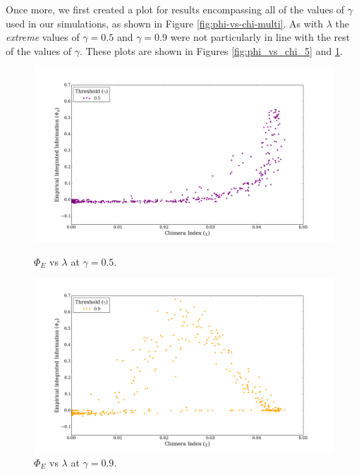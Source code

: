 \documentclass[a4paper,11pt]{article}
\begin{document}
Once more, we first created a plot for results encompassing all of the values of $\gamma$ used in our simulations, as shown in Figure \ref{fig:phi-vs-chi-multi}. As with $\lambda$ the \textit{extreme} values of $\gamma = 0.5$ and $\gamma = 0.9$ were not particularly in line with the rest of the values of $\gamma$. These plots are shown in Figures \ref{fig:phi_vs_chi_5} and \ref{fig:phi_vs_chi_9}.

\begin{figure}[H] 
	\label{fig:phi-vs-chi-extremes} 
	\begin{minipage}[b]{0.5\linewidth}
		\begin{center}
		\includegraphics[scale = 0.2]{figures/phi_vs_chi_5}
		\caption{
			$\Phi_E$ vs $\lambda$ at $\gamma = 0.5$.
			\label{fig:phi_vs_chi_5}
		}
		\end{center}
		\vspace{2ex}
	\end{minipage}
	\begin{minipage}[b]{0.5\linewidth}
		\begin{center}
		\includegraphics[scale = 0.2]{figures/phi_vs_chi_9}
		\caption{
			$\Phi_E$ vs $\lambda$ at $\gamma = 0.9$.
			\label{fig:phi_vs_chi_9}
		}
		\end{center}
		\vspace{2ex}
	\end{minipage}
\end{figure}
\end{document}
